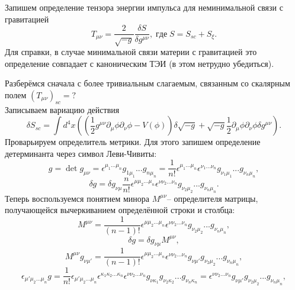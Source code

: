 \documentclass[12pt]{article}
\theoremstyle{definition}
\begin{document}
\begin{enumerate}
Запишем определение тензора энергии импульса для неминимальной связи с гравитацией
\begin{equation}
    T_{\mu\nu}=\frac{2}{\sqrt{-g}}\frac{\delta S}{\delta g^{\mu\nu}}, \; где\; S=S_{sc}+S_{\xi}.
\end{equation}    
Для справки, в случае минимальной связи материи с гравитацией это определение совпадает с каноническим ТЭИ (в этом нетрудно убедиться).

Разберёмся сначала с более тривиальным слагаемым, связанным со скалярным полем $\left(T_{\mu\nu}\right)_{sc}=?$\\
Записываем вариацию действия
\begin{equation}
   \delta S_{sc}=\int d^4x\left(\left(\frac{1}{2}g^{\mu\nu}\partial_\mu\phi\partial_\nu\phi-V(\phi)\right)\delta\sqrt{-g}+\sqrt{-g}\frac{1}{2}\partial_\mu\phi\partial_\nu\phi\delta g^{\mu\nu}\right).
\end{equation}
Проварьируем определитель метрики. Для этого запишем определение детерминанта через символ Леви-Чивиты:
\begin{equation}
    g=\det g_{\mu\nu}=\epsilon^{\mu_1...\mu_n}g_{1\mu_1}...g_{n\mu_n}=\frac{1}{n!}\epsilon^{\mu_1...\mu_n}\epsilon^{\nu_1...\nu_n}g_{\nu_1\mu_1}...g_{\nu_n\mu_n},
\end{equation}
\begin{equation}
    \delta g=\delta g_{\nu\mu}\frac{n}{n!}\epsilon^{\mu\mu_2...\mu_n}\epsilon^{\nu\nu_2...\nu_n}g_{\nu_2\mu_2}...g_{\nu_n\mu_n}.
\end{equation}
Теперь воспользуемся понятием минора $M^{\mu\nu}$-- определителя матрицы, получающейся вычеркиванием определённой строки и столбца:
\begin{equation}
    M^{\mu\nu}=\frac{1}{(n-1)!}\epsilon^{\mu\mu_2...\mu_n}\epsilon^{\nu\nu_2...\nu_n}g_{\nu_2\mu_2}...g_{\nu_n\mu_n},
\end{equation}
\begin{equation}
    \delta g=\delta g_{\nu\mu}M^{\mu\nu},
\end{equation}
\begin{equation}
     M^{\mu\nu}g_{\nu\mu'}=\frac{1}{(n-1)!}\epsilon^{\mu\mu_2...\mu_n}\epsilon^{\nu\nu_2...\nu_n}g_{\nu\mu'}g_{\nu_2\mu_2}...g_{\nu_n\mu_n},
\end{equation}
\begin{equation}
    \epsilon_{\mu'\mu_2...\mu_n}g=\frac{1}{n!}\epsilon_{\mu'\mu_2...\mu_n}\epsilon^{\kappa_1\kappa_2...\kappa_n}\epsilon^{\nu\nu_2...\nu_n}g_{\nu\kappa_1}g_{\nu_2\kappa_2}...g_{\nu_n\kappa_n}=\epsilon^{\nu\nu_2...\nu_n}g_{\nu\mu'}g_{\nu_2\mu_2}...g_{\nu_n\mu_n},

\end{equation}
\end{enumerate}
\end{document}
